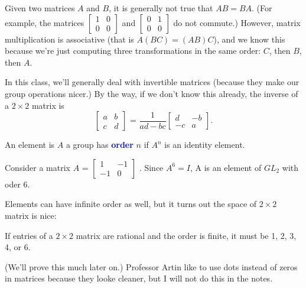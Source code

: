 \documentclass[11pt]{article}
\begin{document}
\begin{fact}
    Given two matrices $A$ and $B$, it is generally not true that $AB = BA$. (For example, the matrices $\begin{bmatrix}
            1 & 0 \\
            0 & 0
        \end{bmatrix}$
    and $\begin{bmatrix}
            0 & 1 \\
            0 & 0\end{bmatrix}$ do not commute.) However, matrix multiplication is associative (that is $A(BC) = (AB)C$), and we know this because we're just computing three transformations in the same order: $C$, then $B$, then $A$.
\end{fact}

In this class, we'll generally deal with invertible matrices (because they make
our group operations nicer.) By the way, if we don't know this already, the
inverse of a $2 \times 2$ matrix is
\[
    \begin{bmatrix}
        a & b \\
        c & d
    \end{bmatrix} \text{ = } \frac{1}{ad - bc} \begin{bmatrix}
        d  & -b \\
        -c & a
    \end{bmatrix}.
\]

\begin{definition}
    An element is $A$ a group has \textcolor{blue}{\textbf{order}} $n$ if $A^n$ is an identity element.
\end{definition}

\begin{example}
    Consider a matrix $A$ = $
        \begin{bmatrix}
            1  & -1 \\
            -1 & 0
        \end{bmatrix}$
    . Since $A^6 = I$, A is an element of $GL_2$ with oder 6.
\end{example}
Elements can have infinite order as well, but it turns out the space of $2 \times 2 $ matrix is nice:

\begin{theorem}
    If entries of a $2 \times 2$ matrix are rational and the order is finite, it must be 1, 2, 3, 4, or 6.
\end{theorem}

(We'll prove this much later on.) Professor Artin like to use dots instead of zeros in matrices because they looke cleaner, but I will not do this in the notes.
\end{document}
